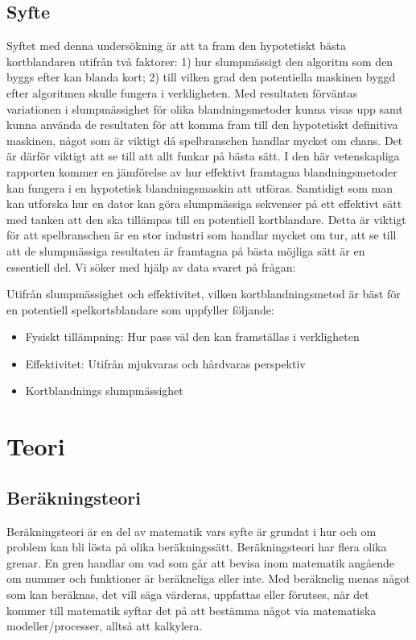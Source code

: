 \documentclass[swedish,a4paper]{article}
\begin{document}
\subsection{Syfte}

Syftet med denna undersökning är att ta fram den hypotetiskt bästa kortblandaren
utifrån två faktorer: 1) hur slumpmässigt den algoritm som den byggs efter kan
blanda kort; 2) till vilken grad den potentiella maskinen byggd efter algoritmen
skulle fungera i verkligheten. Med resultaten förväntas variationen i
slumpmässighet för olika blandningsmetoder kunna visas upp samt kunna använda de
resultaten för att komma fram till den hypotetiskt definitiva maskinen, något
som är viktigt då spelbranschen handlar mycket om chans. Det är därför viktigt
att se till att allt funkar på bästa sätt. I den här vetenskapliga rapporten
kommer en jämförelse av hur effektivt framtagna blandningsmetoder kan fungera i
en hypotetisk blandningsmaskin att utföras. Samtidigt som man kan utforska hur
en dator kan göra slumpmässiga sekvenser på ett effektivt sätt med tanken att
den ska tillämpas till en potentiell kortblandare. Detta är viktigt för att
spelbranschen är en stor industri som handlar mycket om tur, att se till att de
slumpmässiga resultaten är framtagna på bästa möjliga sätt är en essentiell del.
Vi söker med hjälp av data svaret på frågan:

Utifrån slumpmässighet och effektivitet, vilken kortblandningsmetod är bäst för
en potentiell spelkortsblandare som uppfyller följande:
\begin{itemize}
	\item Fysiskt tillämpning: Hur pass väl den kan framställas i verkligheten 
	\item Effektivitet: Utifrån mjukvaras och hårdvaras perspektiv
        \item Kortblandnings slumpmässighet
\end{itemize}


\section{Teori}
\subsection{Beräkningsteori}

Beräkningsteori är en del av matematik vars syfte är grundat i hur och om
problem kan bli lösta på olika beräkningssätt. Beräkningsteori har flera olika
grenar. En gren handlar om vad som går att bevisa inom matematik angående om
nummer och funktioner är beräkneliga eller inte. Med beräknelig menas något som
kan beräknas, det vill säga värderas, uppfattas eller förutses, när det kommer
till matematik syftar det på att bestämma något via matematiska
modeller/processer, alltså att kalkylera.
\end{document}
